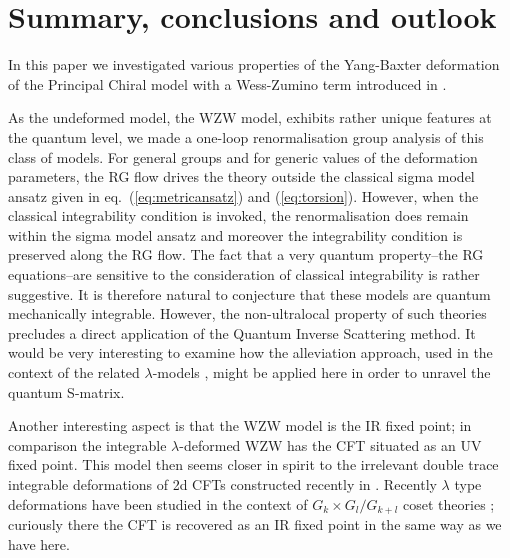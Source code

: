 \documentclass[12pt]{article}
\begin{document}
\section{Summary, conclusions and outlook} \label{s7}

 
In this paper we investigated various properties of the Yang-Baxter deformation of the Principal Chiral model with a Wess-Zumino term introduced in \cite{Delduc:2014uaa}. 
 

As the undeformed model, the WZW model, exhibits rather unique features at the quantum level, we made a one-loop renormalisation group analysis of this class of models. For general groups and for generic values of the deformation parameters, the RG flow drives the theory outside the classical sigma model ansatz given in eq.~(\ref{eq:metricansatz}) and (\ref{eq:torsion}).  However, when the classical integrability condition is invoked, the renormalisation does remain within the sigma model ansatz and moreover the integrability condition is preserved along the RG flow.  The fact that a very quantum property--the RG equations--are sensitive to the consideration of classical integrability is rather suggestive.  It is therefore natural to conjecture that these models are quantum mechanically integrable. However, the non-ultralocal property of such theories precludes a direct application of the Quantum Inverse Scattering method. It would be very interesting to examine how the alleviation approach, used in the context of the related $\lambda$-models \cite{Appadu:2017fff},  might be applied here in order to unravel the quantum S-matrix.  
 
 Another interesting aspect is that the WZW model is the IR fixed point; in comparison the integrable $\lambda$-deformed WZW has the CFT situated as an UV fixed point.   This model then seems closer in spirit to the irrelevant double trace integrable deformations of 2d CFTs constructed recently in  \cite{Smirnov:2016lqw}.  Recently $\lambda$ type deformations have been studied in the context of $G_{k}\times G_{l}/ G_{k+l}$ coset theories \cite{Sfetsos:2017sep}; curiously there the CFT is recovered as an IR fixed point in the same way as we have here.
 
\end{document}
